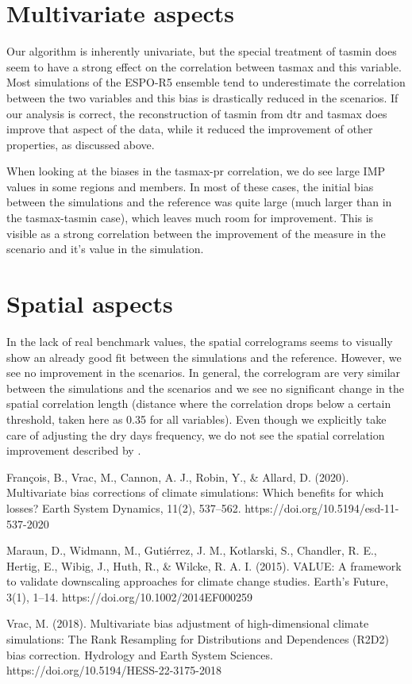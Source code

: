 \documentclass[letterpaper,10pt]{article}
\begin{document}
\section{Multivariate aspects}
Our algorithm is inherently univariate, but the special treatment of tasmin does seem to have a strong effect on the correlation between tasmax and this variable. Most simulations of the ESPO-R5 ensemble tend to underestimate the correlation between the two variables and this bias is drastically reduced in the scenarios. If our analysis is correct, the reconstruction of tasmin from dtr and tasmax does improve that aspect of the data, while it reduced the improvement of other properties, as discussed above.

When looking at the biases in the tasmax-pr correlation, we do see large IMP values in some regions and members. In most of these cases, the initial bias between the simulations and the reference was quite large (much larger than in the tasmax-tasmin case), which leaves much room for improvement. This is visible as a strong correlation between the improvement of the measure in the scenario and it's value in the simulation.

\section{Spatial aspects}
In the lack of real benchmark values, the spatial correlograms seems to visually show an already good fit between the simulations and the reference. However, we see no improvement in the scenarios. In general, the correlogram are very similar between the simulations and the scenarios and we see no significant change in the spatial correlation length (distance where the correlation drops below a certain threshold, taken here as 0.35 for all variables). Even though we explicitly take care of adjusting the dry days frequency, we do not see the spatial correlation improvement described by \cite{Francois2020}.

\begin{thebibliography}{6}
 François, B., Vrac, M., Cannon, A. J., Robin, Y., \& Allard, D. (2020). Multivariate bias corrections of climate simulations: Which benefits for which losses? Earth System Dynamics, 11(2), 537–562. https://doi.org/10.5194/esd-11-537-2020

 Maraun, D., Widmann, M., Gutiérrez, J. M., Kotlarski, S., Chandler, R. E., Hertig, E., Wibig, J., Huth, R., \& Wilcke, R. A. I. (2015). VALUE: A framework to validate downscaling approaches for climate change studies. Earth’s Future, 3(1), 1–14. https://doi.org/10.1002/2014EF000259

 Vrac, M. (2018). Multivariate bias adjustment of high-dimensional climate simulations: The Rank Resampling for Distributions and Dependences (R2D2) bias correction. Hydrology and Earth System Sciences. https://doi.org/10.5194/HESS-22-3175-2018


\end{thebibliography}
\end{document}

